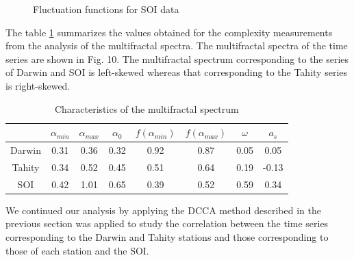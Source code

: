\documentclass[onecolumn, preprint,aps,amsmath, amssymb, superscriptaddress]{revtex4}
\begin{document}
\begin{figure}
\caption{Fluctuation functions for SOI data}
\label{fig:mfdfa_soi}
\end{figure}



The table \ref{tab:mfdfa} summarizes the values obtained for the complexity measurements from
the analysis of the multifractal spectra. The multifractal spectra of
the time series are shown in Fig. 10.
The multifractal spectrum corresponding to the series of Darwin and SOI is left-skewed whereas that corresponding to the Tahity series is right-skewed. 

\begin{table}[t]
\begin{center}
\begin{tabular}{ c  c  c  c  c  c  c  c }
\hline

   & $\alpha_{min}$  & $\alpha_{max}$ & $\alpha_0$ & $f(\alpha_{min})$ & $f(\alpha_{max})$ & $\omega$& $a_s$ \\ \hline
Darwin   & 0.31  & 0.36  & 0.32  & 0.92 &  0.87 &  0.05 &  0.05 \\
Tahity     & 0.34  & 0.52  & 0.45  & 0.51 &  0.64 &  0.19 &  -0.13 \\
SOI     & 0.42  & 1.01  & 0.65  & 0.39 &  0.52 &  0.59 &  0.34 \\
\hline
\end{tabular}
\caption{Characteristics of the multifractal spectrum}
\label{tab:mfdfa}
\end{center}
\end{table}


We continued our analysis by applying the DCCA method described in the previous section was applied to study the correlation between the time series corresponding to the Darwin and Tahity stations and those corresponding to those of each station and the SOI.
\end{document}
